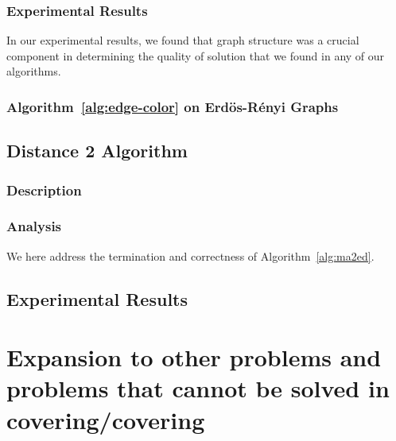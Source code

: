 \documentclass[twoside]{article}
\begin{document}
\subsubsection{Experimental Results}

In our experimental results, we found that graph structure was a crucial component in determining the quality of solution that we found in any of our algorithms.

\subsubsection{Algorithm~\ref{alg:edge-color} on Erd\"{o}s-R\'{e}nyi Graphs}

\subsection{Distance 2 Algorithm}
\subsubsection{Description}
\label{sub:dima2ed-description}



\subsubsection{Analysis}
We here address the termination and correctness of Algorithm~\ref{alg:ma2ed}.


\subsection{Experimental Results}
\label{sub:experiment-erdren-direct}

\section{Expansion to other problems and problems that cannot be solved in covering/covering}



\end{document}
